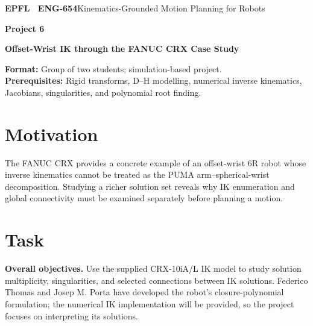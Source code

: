\documentclass[11pt,a4paper]{article}
\begin{document}
{\small\textbf{EPFL \textbar\ ENG-654}\hfill Kinematics-Grounded Motion Planning for Robots}
\vspace{5mm}

{\color{epflred}\Large\bfseries Project 6}

{\LARGE\bfseries Offset-Wrist IK through the FANUC CRX Case Study\par}

\textbf{Format:} Group of two students; simulation-based project.\\
\textbf{Prerequisites:} Rigid transforms, D--H modelling, numerical inverse
kinematics, Jacobians, singularities, and polynomial root finding.

\section*{Motivation}
The FANUC CRX provides a concrete example of an offset-wrist 6R robot
whose inverse kinematics cannot be treated as the PUMA arm--spherical-wrist
decomposition. Studying a richer solution set reveals why IK enumeration and
global connectivity must be examined separately before planning a motion.

\section*{Task}
\textbf{Overall objectives.} Use the supplied CRX-10iA/L IK model to study solution multiplicity,
singularities, and selected connections between IK solutions. Federico Thomas
and Josep M. Porta have developed the robot's closure-polynomial formulation;
the numerical IK implementation will be provided, so the project focuses on
interpreting its solutions.
\end{document}
